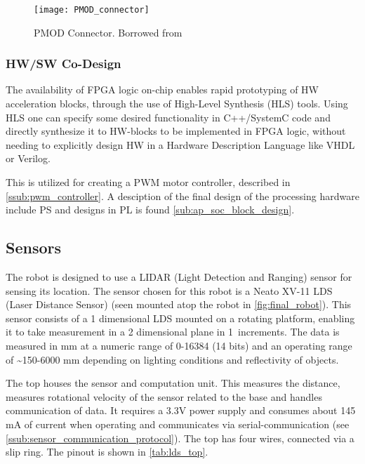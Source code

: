 \documentclass[Main]{subfiles}
\begin{document}
		\begin{figure}[H]
			\centering
			\texttt{[image: PMOD\_connector]}
			\caption{PMOD Connector. Borrowed from \cite{Digilent2014}}
			\label{fig:pmod}
		\end{figure}

		\subsubsection{HW/SW Co-Design} %
		\label{ssub:hw_sw_co_design}

			The availability of FPGA logic on-chip enables rapid prototyping of HW acceleration blocks, through the use of High-Level Synthesis (HLS) tools.
			Using HLS one can specify some desired functionality in C++/SystemC code and directly synthesize it to HW-blocks to be implemented in FPGA logic, without needing to explicitly design HW in a Hardware Description Language like VHDL or Verilog.

			This is utilized for creating a PWM motor controller, described in \autoref{ssub:pwm_controller}.
			A desciption of the final design of the processing hardware include PS and designs in PL is found \autoref{sub:ap_soc_block_design}.
			
	

	\subsection{Sensors} %
	\label{sub:sensor}

		The robot is designed to use a LIDAR (Light Detection and Ranging) sensor for sensing its location.
		The sensor chosen for this robot is a Neato XV-11 LDS (Laser Distance Sensor) (seen mounted atop the robot in \autoref{fig:final_robot}).
		This sensor consists of a 1 dimensional LDS mounted on a rotating platform, enabling it to take measurement in a 2 dimensional plane in 1\degree\ increments.
		The data is measured in mm at a numeric range of 0-16384 (14 bits) and an operating range of \textasciitilde 150-6000 mm depending on lighting conditions and reflectivity of objects.

		The top houses the sensor and computation unit. This measures the distance, measures rotational velocity of the sensor related to the base and handles communication of data.
		It requires a 3.3V power supply and consumes about 145 mA of current when operating and communicates via serial-communication (see \autoref{ssub:sensor_communication_protocol}).
		The top has four wires, connected via a slip ring. 
		The pinout is shown in \autoref{tab:lds_top}.
\end{document}
